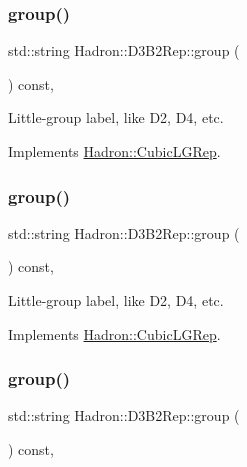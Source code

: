 \subsubsection{\texorpdfstring{group()}{group()}\hspace{0.1cm}{\footnotesize\ttfamily [3/5]}}
{\footnotesize\ttfamily std\+::string Hadron\+::\+D3\+B2\+Rep\+::group (\begin{DoxyParamCaption}{ }\end{DoxyParamCaption}) const\hspace{0.3cm}{\ttfamily [inline]}, {\ttfamily [virtual]}}

Little-\/group label, like D2, D4, etc. 

Implements \mbox{\hyperlink{structHadron_1_1CubicLGRep_a9bdb14b519a611d21379ed96a3a9eb41}{Hadron\+::\+Cubic\+L\+G\+Rep}}.

\mbox{\label{structHadron_1_1D3B2Rep_a369bb27633b844c9d9a2023f27cfff74}} 
\subsubsection{\texorpdfstring{group()}{group()}\hspace{0.1cm}{\footnotesize\ttfamily [4/5]}}
{\footnotesize\ttfamily std\+::string Hadron\+::\+D3\+B2\+Rep\+::group (\begin{DoxyParamCaption}{ }\end{DoxyParamCaption}) const\hspace{0.3cm}{\ttfamily [inline]}, {\ttfamily [virtual]}}

Little-\/group label, like D2, D4, etc. 

Implements \mbox{\hyperlink{structHadron_1_1CubicLGRep_a9bdb14b519a611d21379ed96a3a9eb41}{Hadron\+::\+Cubic\+L\+G\+Rep}}.

\mbox{\label{structHadron_1_1D3B2Rep_a369bb27633b844c9d9a2023f27cfff74}} 
\subsubsection{\texorpdfstring{group()}{group()}\hspace{0.1cm}{\footnotesize\ttfamily [5/5]}}
{\footnotesize\ttfamily std\+::string Hadron\+::\+D3\+B2\+Rep\+::group (\begin{DoxyParamCaption}{ }\end{DoxyParamCaption}) const\hspace{0.3cm}{\ttfamily [inline]}, {\ttfamily [virtual]}}


